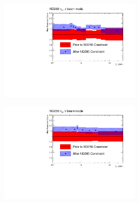 \begin{figure}[h]
	\begin{subfigure}[t]{\textwidth}
		\begin{subfigure}[t]{0.24\textwidth}
			\includegraphics[width=\textwidth, trim={0mm 0mm 20mm 0mm}, clip]{figures/official/nd_pf_numu_flux_parms_bias_01}
		\end{subfigure}
		\begin{subfigure}[t]{0.24\textwidth}
			\includegraphics[width=\textwidth, trim={0mm 0mm 20mm 0mm}, clip]{figures/official/nd_pf_nue_flux_parms_bias_01}
		\end{subfigure}
		\begin{subfigure}[t]{0.24\textwidth}

\end{subfigure}
\end{subfigure}
\end{figure}
